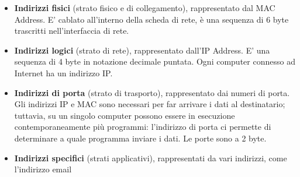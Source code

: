         \begin{itemize}
            \item 
                \textbf{Indirizzi fisici} (strato fisico e di collegamento), rappresentato dal MAC Address. E' cablato all'interno della scheda di rete, è una sequenza di 6 byte trascritti nell'interfaccia di rete.
            
            \item
                \textbf{Indirizzi logici} (strato di rete), rappresentato dall'IP Address. E' una sequenza di 4 byte in notazione decimale puntata. Ogni computer connesso ad Internet ha un indirizzo IP.
            
            \item
                \textbf{Indirizzi di porta }(strato di trasporto), rappresentato dai numeri di porta. Gli indirizzi IP e MAC sono necessari per far arrivare i dati al destinatario; tuttavia, su un singolo computer possono essere in esecuzione contemporaneamente più programmi: l'indirizzo di porta ci permette di determinare a quale programma inviare i dati. Le porte sono a 2 byte.
            
            \item
                \textbf{Indirizzi specifici} (strati applicativi), rappresentati da vari indirizzi, come l'indirizzo email
        \end{itemize}

